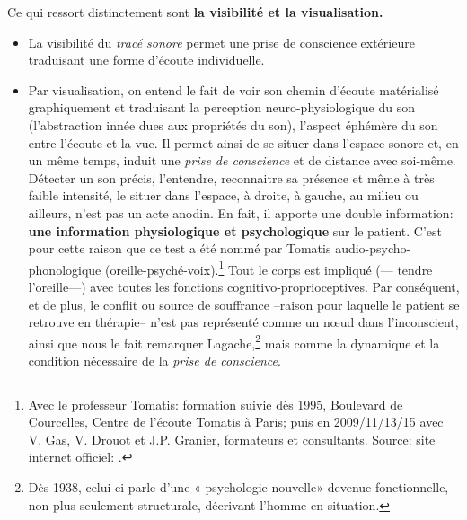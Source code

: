 


Ce qui  ressort distinctement sont \textbf{ la visibilité et la visualisation.}
\begin{itemize}
 
\item La visibilité du \textit{tracé sonore} permet une prise de conscience
  extérieure traduisant une forme  d'écoute individuelle.%


\item Par  visualisation, on entend le fait de voir son chemin d'écoute
matérialisé  graphiquement et traduisant la perception
neuro-physiologique du son (l'abstraction innée dues aux propriétés du son), l'aspect éphémère du son entre l'écoute et la vue.
Il permet ainsi de se situer dans l'espace sonore et, en un même
temps, induit une \textit{prise de conscience }et de distance avec
soi-même.  Détecter un son précis, l'entendre, reconnaitre sa présence et même à très
 faible intensité, le situer dans l'espace, à droite, à gauche, au
 milieu ou ailleurs, n'est pas un acte anodin. En fait,  il apporte
 une double information: \textbf{une information
   physiologique et psychologique} sur le patient.
 C'est pour cette raison que ce test a été nommé par Tomatis
 audio-psycho-phonologique (oreille-psyché-voix).\footnote{Avec le professeur Tomatis: formation suivie dès 1995, Boulevard de Courcelles, Centre de l'écoute 
Tomatis à Paris; puis en 2009/11/13/15 avec V. Gas, V. Drouot et J.P. Granier, formateurs et consultants. Source: site internet officiel: \cite{tomatis.com}.}
Tout le corps est impliqué (--- tendre l'oreille---) avec toutes les fonctions cognitivo-proprioceptives.
Par conséquent, et de plus, le conflit ou source de souffrance --raison pour laquelle le
patient se retrouve en thérapie--  n’est pas représenté
comme un nœud dans l’inconscient, ainsi que nous le fait remarquer Lagache,\footnote{Dès 1938, celui-ci parle d’une « psychologie nouvelle» devenue fonctionnelle, non plus seulement structurale, décrivant l’homme en
   situation.}
 mais comme la
dynamique et la condition nécessaire de la \textit{prise de
  conscience}.
\end{itemize}

